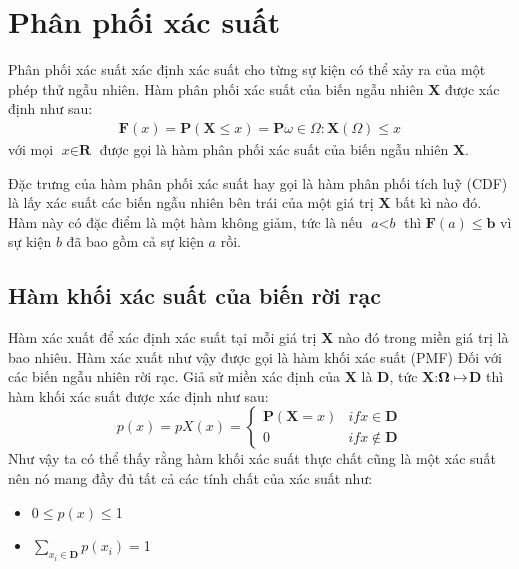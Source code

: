 \section{Phân phối xác suất}\label{sec:1.2}
Phân phối xác suất xác định xác suất cho từng sự kiện có thể xảy ra của một phép thử ngẫu nhiên. Hàm phân phối xác suất của biến ngẫu nhiên \textbf{X} được xác định như sau:
\begin{align}
	\textbf{F}(x)=\textbf{P}(\textbf{X}\leq\textit{x})=\textbf{P}{\omega\in\Omega:\textbf{X}(\Omega)\leq\textit{x}} 
\end{align}
với mọi $\textit{x}\in\textbf{R}$ được gọi là hàm phân phối xác suất của biến ngẫu nhiên $\textbf{X}$.

Đặc trưng của hàm phân phối xác suất hay gọi là hàm phân phối tích luỹ (CDF)
là lấy xác suất các biến ngẫu nhiên bên trái của một giá trị \textbf{X} bất kì nào đó.
Hàm này có đặc điểm là một hàm không giảm, tức là nếu $\textit{a}<\textit{b}$
thì $\textbf{F}(a)\leq\textbf{b}$ vì sự kiện $\textit{b}$ đã bao gồm cả sự kiện $\textit{a}$ rồi.
\par
\subsection{Hàm khối xác suất của biến rời rạc}\label{subsec:1.2.1}
Hàm xác xuất để xác định xác suất tại mỗi giá trị \textbf{X} nào đó trong miền giá trị là bao nhiêu.
Hàm xác xuất như vậy được gọi là hàm khối xác suất (PMF) Đối với các biến ngẫu nhiên rời rạc. 
Giả sử miền xác định của $\textbf{X}$ là $\textbf{D}$, tức $\textbf{X}$:$\bf\Omega\mapsto$$\textbf{D}$ thì hàm khối xác suất được xác định như sau: 
\begin{equation}
	\textit{p}(x)=\textit{p}\textit{X}(\textit{x})=
	\begin{cases}
	\textbf{P}(\textbf{X}=\textit{x}) &if \textit{x}\in\textbf{D}\\
	0 &if \textit{x}\notin\textbf{D}
	\end{cases}
\end{equation}
Như vậy ta có thể thấy rằng hàm khối xác suất thực chất cũng là một xác suất nên nó mang đầy đủ tất cả các tính chất của xác suất như:
\begin{itemize}
	\item 0$\leq\textit{p}(x)\leq$1
	\item $\sum_{x_i\in\textbf{D}}\textit{p}(x_{i})=$1
\end{itemize}
\par
